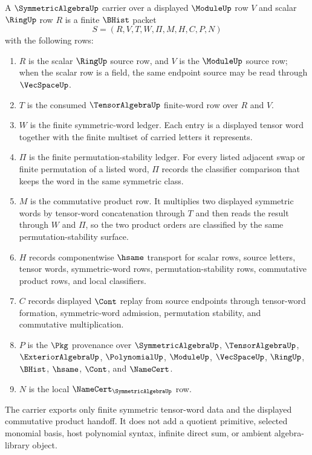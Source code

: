 \begin{definition}
\label{def:symmetric-algebra-carrier}
A $\SymmetricAlgebraUp$ carrier over a displayed $\ModuleUp$ row $V$ and scalar $\RingUp$ row $R$ is a finite $\BHist$ packet
$$
S=(R,V,T,W,\Pi,M,H,C,P,N)
$$
with the following rows:
\begin{enumerate}
\item $R$ is the scalar $\RingUp$ source row, and $V$ is the $\ModuleUp$ source row; when the scalar row is a field, the same endpoint source may be read through $\VecSpaceUp$.
\item $T$ is the consumed $\TensorAlgebraUp$ finite-word row over $R$ and $V$.
\item $W$ is the finite symmetric-word ledger. Each entry is a displayed tensor word together with the finite multiset of carried letters it represents.
\item $\Pi$ is the finite permutation-stability ledger. For every listed adjacent swap or finite permutation of a listed word, $\Pi$ records the classifier comparison that keeps the word in the same symmetric class.
\item $M$ is the commutative product row. It multiplies two displayed symmetric words by tensor-word concatenation through $T$ and then reads the result through $W$ and $\Pi$, so the two product orders are classified by the same permutation-stability surface.
\item $H$ records componentwise $\hsame$ transport for scalar rows, source letters, tensor words, symmetric-word rows, permutation-stability rows, commutative product rows, and local classifiers.
\item $C$ records displayed $\Cont$ replay from source endpoints through tensor-word formation, symmetric-word admission, permutation stability, and commutative multiplication.
\item $P$ is the $\Pkg$ provenance over $\SymmetricAlgebraUp$, $\TensorAlgebraUp$, $\ExteriorAlgebraUp$, $\PolynomialUp$, $\ModuleUp$, $\VecSpaceUp$, $\RingUp$, $\BHist$, $\hsame$, $\Cont$, and $\NameCert$.
\item $N$ is the local $\NameCert_{\SymmetricAlgebraUp}$ row.
\end{enumerate}
The carrier exports only finite symmetric tensor-word data and the displayed commutative product handoff. It does not add a quotient primitive, selected monomial basis, host polynomial syntax, infinite direct sum, or ambient algebra-library object.
\end{definition}

